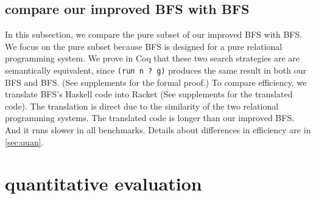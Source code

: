 \documentclass[format=acmlarge, review=true, authordraft=true]{acmart}
\newcommand{\BFS}[0]{BFS}
\newcommand{\BFSser}[0]{BFS}
\newcommand{\BFSimp}[0]{our improved BFS}
\begin{document}
\subsection{compare \BFSimp{} with \BFSser{}}

In this subsection, we compare the pure subset of \BFSimp{} with \BFSser{}. We 
focus on the pure subset because \BFSser{} is designed for a pure 
relational programming system. We prove in Coq that these two search strategies 
are are semantically equivalent, since \texttt{(run n ? g)} produces the same 
result in both our BFS and BFS. (See supplements for the formal proof.) To 
compare efficiency, we 
translate \BFS{}'s Haskell code into Racket (See supplements for the 
translated code). The translation is direct due to the similarity of the two 
relational programming systems. The translated code is longer than \BFSimp{}. 
And it runs slower in all benchmarks. Details about differences in efficiency 
are in \autoref{sec:quan}.

\section{quantitative evaluation}
\label{sec:quan}
\end{document}
